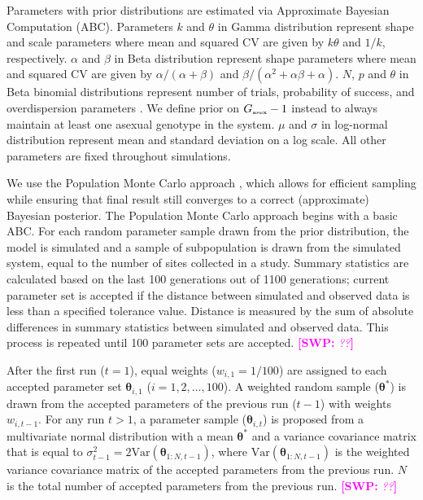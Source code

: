 \documentclass{article}\usepackage[]{graphicx}\usepackage[]{color}
\newcommand{\comment}[3]{\textcolor{#1}{\textbf{[#2: }\textit{#3}\textbf{]}}}
\newcommand{\swp}[1]{\comment{magenta}{SWP}{#1}}
\begin{document}
{\begin{landscape}
\begin{table}[h]
{Parameters with prior distributions are estimated via Approximate Bayesian Computation (ABC).
Parameters $k$ and $\theta$ in Gamma distribution represent shape and scale parameters where mean and squared CV are given by $k \theta$ and $1/k$, respectively.
$\alpha$ and $\beta$ in Beta distribution represent shape parameters where mean and squared CV are given by $\alpha/(\alpha+\beta)$ and $\beta/(\alpha^2 + \alpha \beta + \alpha)$.
$N$, $p$ and $\theta$ in Beta binomial distributions represent number of trials, probability of success, and overdispersion parameters \citep{morris1983natural}.
We define prior on $G_{\textrm{\tiny asex}} -1$ instead to always maintain at least one asexual genotype in the system.
$\mu$ and $\sigma$ in log-normal distribution represent mean and standard deviation on a log scale.
All other parameters are fixed throughout simulations.
}
\label{tb:param}
\end{table}
\end{landscape}
}

We use the Population Monte Carlo approach \citep{turner2012tutorial}, which allows for efficient sampling while ensuring that final result still converges to a correct (approximate) Bayesian posterior.
The Population Monte Carlo approach begins with a basic ABC.
For each random parameter sample drawn from the prior distribution, the model is simulated and a sample of subpopulation is drawn from the simulated system, equal to the number of sites collected in a study.
Summary statistics are calculated based on the last 100 generations out of 1100 generations; current parameter set is accepted if the distance between simulated and observed data is less than a specified tolerance value.
Distance is measured by the sum of absolute differences in summary statistics between simulated and observed data. This process is repeated until 100 parameter sets are accepted.
\swp{??}

After the first run ($t=1$), equal weights ($w_{i,1}=1/100$) are assigned to each accepted parameter set $\bm\theta_{i, 1}$ ($i = 1, 2, \dots, 100$).
A weighted random sample ($\bm\theta^\ast$) is drawn from the accepted parameters of the previous run ($t-1$) with weights $w_{i,t-1}$.
For any run $t > 1$, a parameter sample ($\bm\theta_{i, t}$) is proposed from a multivariate normal distribution with a mean $\bm\theta^\ast$ and a variance covariance matrix that is equal to $\sigma_{t-1}^2=2 \mathrm{Var}(\bm\theta_{1:N, t-1})$, where $\mathrm{Var}(\bm\theta_{1:N, t-1})$ is the weighted variance covariance matrix of the accepted parameters from the previous run.
$N$ is the total number of accepted parameters from the previous run.
\swp{??}
\end{document}
